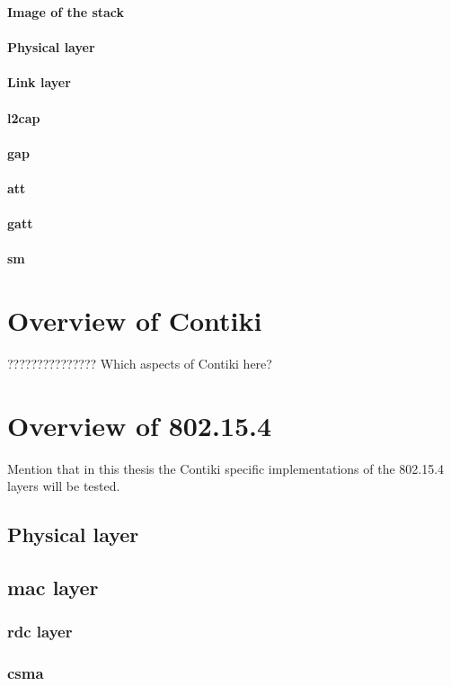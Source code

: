 \textbf{Image of the stack}

\paragraph{Physical layer}
\paragraph{Link layer}
\paragraph{\gls{l2cap}}
\paragraph{\gls{gap}}
\paragraph{\gls{att}}
\paragraph{\gls{gatt}}
\paragraph{\gls{sm}}

\section{Overview of Contiki}
??????????????? Which aspects of Contiki here?

\section{Overview of 802.15.4}
Mention that in this thesis the Contiki specific implementations of the 802.15.4 layers will be tested.

\subsection{Physical layer}

\subsection{\gls{mac} layer}
\subsubsection{\gls{rdc} layer}
\subsubsection{\gls{csma}}


